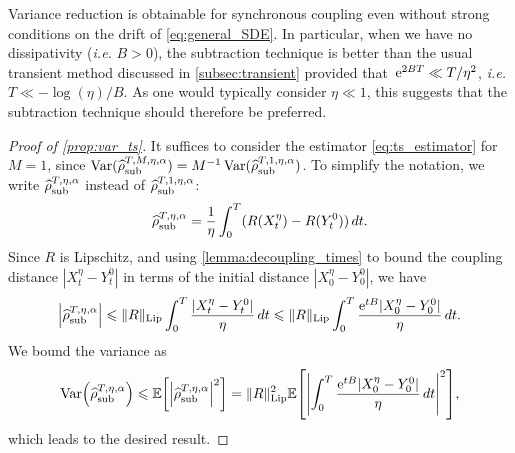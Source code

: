 \begin{remark}
	Variance reduction is obtainable for synchronous coupling even without strong conditions on the drift of \eqref{eq:general_SDE}. In particular, when we have no dissipativity (\emph{i.e.} $B>0$), the subtraction technique is better than the usual transient method discussed in \cref{subsec:transient} provided that~$\mathrm{e}^{2BT} \ll T/\eta^2$, \emph{i.e.} $T\ll -\log(\eta)/B$. As one would typically consider $\eta\ll 1$, this suggests that the subtraction technique should therefore be preferred. 
\end{remark}

\begin{proof}[Proof of \cref{prop:var_ts}]
It suffices to consider the estimator \eqref{eq:ts_estimator} for $M=1$, since $\operatorname{Var}(\widehat{\rho}^{T,M,\eta,\alpha}_{\rm sub}) = M^{-1}\operatorname{Var}(\widehat{\rho}^{T,1,\eta,\alpha}_{\rm sub})$. To simplify the notation, we write $\widehat{\rho}^{T,\eta,\alpha}_{\rm sub}$ instead of $\widehat{\rho}^{T,1,\eta,\alpha}_{\rm sub}$:
	\begin{equation}
		\widehat{\rho}^{T,\eta,\alpha}_{\rm sub} = \frac{1}{\eta}\int_0^T (R(X_t^\eta) - R(Y_t^0)) \, dt.
	\end{equation}
	Since $R$ is Lipschitz, and using \cref{lemma:decoupling_times} to bound the coupling distance $|X_t^\eta - Y_t^0|$ in terms of the initial distance $|X_0^\eta - Y_0^0|$, we have
	\begin{align}
		\label{eq:rhoLipschitz}
		\abs*{\asTSest} \leq \RLip \int_0^T \frac{|X_t^\eta - Y_t^0|}{\eta} \, dt \leq \RLip \int_0^T \frac{\e^{tB}|X_0^\eta - Y_0^0|}{\eta} \, dt.
	\end{align}
	We bound the variance as
	\begin{align}
		\Var\paren*{\asTSest} 
		\leq \E\bkt*{\abs*{\asTSest}^2} = \RLip^2\E\bkt*{\abs*{\int_0^T \frac{\e^{tB}|X_0^\eta - Y_0^0|}{\eta} \, dt}^2},
		\label{eq:var_integral_bound}
	\end{align}
	which leads to the desired result.
	\begin{comment}
	To make precise the bounds above, we distinguish the between the cases $B\ne 0$ and $B=0$.
	
	\paragraph{Case $B\ne 0$.} Evaluating the integral in \eqref{eq:var_integral_bound} leads to
	\begin{align}
		\Var\paren*{\asTSest} \leq \E\bkt*{\frac{\RLip^2}{B^2}\frac{|X_0^\eta - Y_0^\eta|^2}{\eta^2}(\e^{TB}-1)^2},
		\label{eq:ts_var_int}
	\end{align}
	with the desired bound \eqref{eq:var_prop_bound} obtained by noting that $(\e^{TB}-1)^2$ is bounded by $\e^{2BT}$ for $B>0$, and by 1 for $B<0$.
	

\end{comment}
\end{proof}
